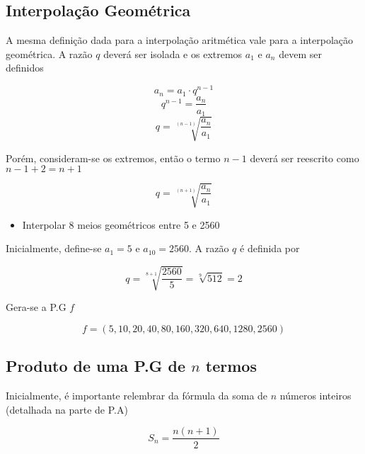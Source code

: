 \subsection{Interpolação Geométrica}

A mesma definição dada para a interpolação aritmética vale para a interpolação geométrica. A razão $q$ deverá ser isolada e os extremos $a_{1}$ e $a_{n}$ devem ser definidos

\begin{tcolorbox}[colback=LightYellow]
\[a_{n} = a_{1}\cdot q^{n - 1}\]
\[q^{n - 1} = \frac{a_{n}}{a_{1}}\]
\[q = \sqrt[(n - 1)]{\frac{a_{n}}{a_{1}}}\]
\end{tcolorbox}

Porém, consideram-se os extremos, então o termo $n - 1$ deverá ser reescrito como $n - 1 + 2 = n + 1$

\begin{tcolorbox}[colback=LightYellow]
\[q = \sqrt[(n + 1)]{\frac{a_{n}}{a_{1}}}\]
\end{tcolorbox}

\begin{tcolorbox}[colback=LightYellow]
\begin{itemize}
        \item Interpolar 8 meios geométricos entre 5 e 2560
\end{itemize}
\end{tcolorbox}


\begin{tcolorbox}[colback=LightYellow]
  Inicialmente, define-se $a_{1} = 5$ e $a_{10} = 2560$. A razão $q$ é definida por

  \[q = \sqrt[8 + 1]{\frac{2560}{5}} = \sqrt[9]{512} = 2\]

  Gera-se a P.G $f$

  \[f = (5 , 10, 20, 40, 80, 160, 320, 640, 1280, 2560)\]
\end{tcolorbox}

\subsection{Produto de uma P.G de $n$ termos}

Inicialmente, é importante relembrar da fórmula da soma de $n$ números inteiros (detalhada na parte de P.A)

\begin{tcolorbox}[colback=LightYellow]
\[S_{n} = \frac{n(n + 1)}{2}\]
\end{tcolorbox}

